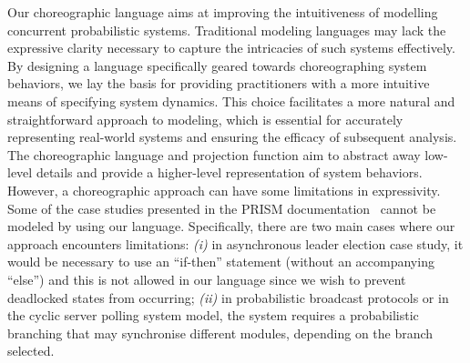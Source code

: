 Our choreographic language %
aims at improving the intuitiveness of modelling concurrent
probabilistic systems. Traditional modeling languages may lack the
expressive clarity necessary to capture the intricacies of such
systems effectively. By designing a language specifically geared
towards choreographing system behaviors, we lay the basis for
providing practitioners with a more intuitive means of specifying
system dynamics. This choice facilitates a more natural and
straightforward approach to modeling, which is essential for
accurately representing real-world systems and ensuring the efficacy
of subsequent analysis.
%
The choreographic language and projection function aim to abstract
away low-level details and provide a higher-level representation of
system behaviors. 
However, a choreographic approach can have some limitations in
expressivity. Some of the case studies presented in the PRISM
documentation~\cite{PRISMdoc} cannot be modeled by using our
language. Specifically, there are two main cases where our approach
encounters limitations:
%
\textit{(i)} in asynchronous leader election case study, it would be
necessary to use an ``if-then'' statement (without an accompanying
``else'') and this is not allowed in our language since we wish to
prevent deadlocked states from occurring; 
%
\textit{(ii)} in probabilistic broadcast protocols or in the cyclic
server polling system model, the system requires a probabilistic
branching that may synchronise different modules, depending on the
branch selected.
%
